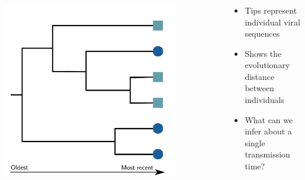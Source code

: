 \documentclass[aspectratio=169]{beamer}
\begin{document}
\begin{frame} \frametitle{\insertsection}

    \begin{columns}

        \begin{column}{0.6\textwidth}
            
            \begin{center}
                \centering\includegraphics[width=0.8\textwidth]{images/tree-blank}
            \end{center}

        \end{column}

        \begin{column}{0.5\textwidth}

            \begin{itemize}
                \item Tips represent individual viral sequences
                \item Shows the evolutionary distance between individuals
                \item What can we infer about a single transmission time?
            \end{itemize}

        \end{column}

    \end{columns}

\end{frame}
\end{document}

